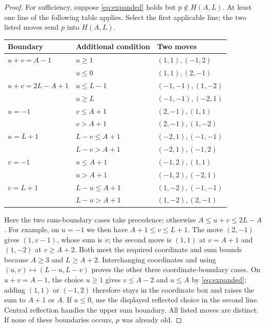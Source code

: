 \documentclass[11pt]{article}
\begin{document}
\begin{proof}
For sufficiency, suppose \eqref{eq:expanded} holds but $p\notin H(A,L)$.
At least one line of the following table applies. Select the first
applicable line; the two listed moves send $p$ into $H(A,L)$.
\begin{center}\small
\begin{tabular}{lll}
\toprule
Boundary & Additional condition & Two moves\\
\midrule
$u+v=A-1$ & $u\geq1$ & $(1,1),(-1,2)$\\
 & $u\leq0$ & $(1,1),(2,-1)$\\
$u+v=2L-A+1$ & $u\leq L-1$ & $(-1,-1),(1,-2)$\\
 & $u\geq L$ & $(-1,-1),(-2,1)$\\
$u=-1$ & $v\leq A+1$ & $(2,-1),(1,1)$\\
 & $v>A+1$ & $(2,-1),(1,-2)$\\
$u=L+1$ & $L-v\leq A+1$ & $(-2,1),(-1,-1)$\\
 & $L-v>A+1$ & $(-2,1),(-1,2)$\\
$v=-1$ & $u\leq A+1$ & $(-1,2),(1,1)$\\
 & $u>A+1$ & $(-1,2),(-2,1)$\\
$v=L+1$ & $L-u\leq A+1$ & $(1,-2),(-1,-1)$\\
 & $L-u>A+1$ & $(1,-2),(2,-1)$\\
\bottomrule
\end{tabular}
\end{center}
Here the two sum-boundary cases take precedence; otherwise
$A\leq u+v\leq2L-A$. For example, on $u=-1$ we then have
$A+1\leq v\leq L+1$. The move $(2,-1)$ gives $(1,v-1)$, whose sum is $v$;
the second move is $(1,1)$ at $v=A+1$ and $(1,-2)$ at $v\geq A+2$.
Both meet the required coordinate and sum bounds because $A\geq3$ and
$L\geq A+2$. Interchanging coordinates and using
$(u,v)\mapsto(L-u,L-v)$ proves the other three coordinate-boundary cases.
On $u+v=A-1$, the choice $u\geq1$ gives $v\leq A-2$ and
$u\leq A$ by \eqref{eq:expanded}; adding $(1,1)$ or $(-1,2)$ therefore
stays in the coordinate box and raises the sum to $A+1$ or $A$.
If $u\leq0$, use the displayed reflected choice in the second line.
Central reflection handles the upper sum boundary. All listed moves are
distinct. If none of these boundaries occurs, $p$ was already old.
\end{proof}
\end{document}
